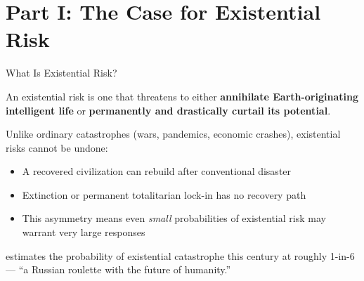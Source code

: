 \documentclass[aspectratio=169,11pt]{beamer}
\begin{document}
\section{Part I: The Case for Existential Risk}

\begin{frame}[shrink=5]{What Is Existential Risk?}
\begin{conceptbox}
An existential risk is one that threatens to either \textbf{annihilate Earth-originating intelligent life} or \textbf{permanently and drastically curtail its potential}.
\vspace{0.1cm}

\scriptsize\textcite{bostrom_existential_risks_2002}
\end{conceptbox}

\vspace{0.2cm}
Unlike ordinary catastrophes (wars, pandemics, economic crashes), existential risks cannot be undone:
\begin{itemize}
    \item A recovered civilization can rebuild after conventional disaster
    \item Extinction or permanent totalitarian lock-in has no recovery path
    \item This asymmetry means even \emph{small} probabilities of existential risk may warrant very large responses
\end{itemize}

\vspace{0.2cm}
\textcite{ord_precipice_2020} estimates the probability of existential catastrophe this century at roughly 1-in-6 --- ``a Russian roulette with the future of humanity.''
\end{frame}
\end{document}
